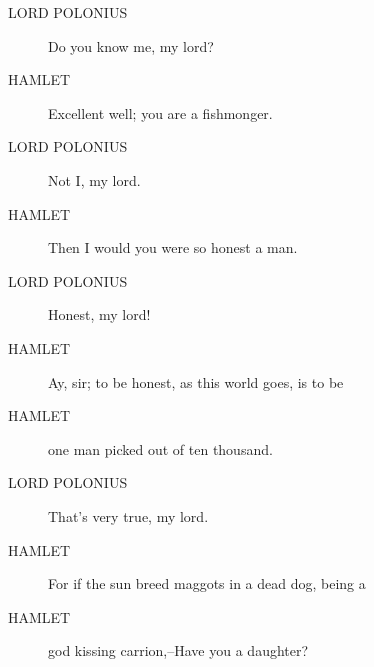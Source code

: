\documentclass{article}
\begin{document}
\begin{description}
            
\item[LORD POLONIUS] Do you know me, my lord?
\end{description}
          
\begin{description}
            
\item[HAMLET] Excellent well; you are a fishmonger.
\end{description}
          
\begin{description}
            
\item[LORD POLONIUS] Not I, my lord.
\end{description}
          
\begin{description}
            
\item[HAMLET] Then I would you were so honest a man.
\end{description}
          
\begin{description}
            
\item[LORD POLONIUS] Honest, my lord!
\end{description}
          
\begin{description}
            
\item[HAMLET] Ay, sir; to be honest, as this world goes, is to be
\item[HAMLET] one man picked out of ten thousand.
\end{description}
          
\begin{description}
            
\item[LORD POLONIUS] That's very true, my lord.
\end{description}
          
\begin{description}
            
\item[HAMLET] For if the sun breed maggots in a dead dog, being a
\item[HAMLET] god kissing carrion,--Have you a daughter?
\end{description}
          
\end{document}
